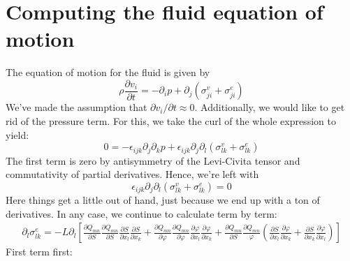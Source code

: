 \documentclass[leqno]{article}
\begin{document}
	\section*{Computing the fluid equation of motion}
	The equation of motion for the fluid is given by
	\[
		\rho \frac{\partial v_i}{\partial t} = -\partial_i p + \partial_j (\sigma^v_{ji} + \sigma^{e}_{ji})
	\]
	We've made the assumption that $\partial v_i/\partial t \approx 0$. Additionally, we would like to get rid of the pressure term. For this, we take the curl of the whole expression to yield:
	\[
		0 = -\epsilon_{ijk} \partial_j \partial_k p + \epsilon_{ijk} \partial_j \partial_l (\sigma^v_{lk} + \sigma^e_{lk})
	\]
	The first term is zero by antisymmetry of the Levi-Civita tensor and commutativity of partial derivatives. Hence, we're left with
	\[
		\epsilon_{ijk} \partial_j \partial_l (\sigma^v_{lk} + \sigma^e_{lk}) = 0
	\]
	Here things get a little out of hand, just because we end up with a ton of derivatives. In any case, we continue to calculate term by term:
	\begin{align*}
		\partial_l \sigma^e_{lk} = -L\partial_l\left[ \frac{\partial Q_{mn}}{\partial S} \frac{\partial Q_{mn}}{\partial S} \frac{\partial S}{\partial x_l} \frac{\partial S}{\partial x_k} + \frac{\partial Q_{mn}}{\partial \varphi} \frac{\partial Q_{mn}}{\partial \varphi} \frac{\partial \varphi}{\partial x_l} \frac{\partial \varphi}{\partial x_k} + \frac{\partial Q_{mn}}{\partial S} \frac{\partial Q_{mn}}{\varphi} \left( \frac{\partial S}{\partial x_l} \frac{\partial \varphi}{\partial x_k} + \frac{\partial S}{\partial x_k}\frac{\partial \varphi}{\partial x_l} \right) \right]
	\end{align*}
	First term first:
\end{document}
